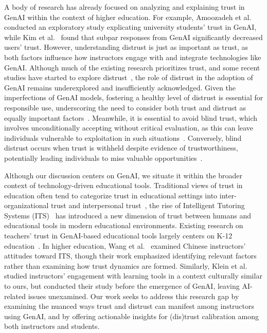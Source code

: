 A body of research has already focused on analyzing and explaining trust in GenAI within the context of higher education. For example, Amoozadeh et al.~\cite{amoozadeh2024trust} conducted an exploratory study explicating university students' trust in GenAI, while Kim et al.~\cite{kim2023you} found that subpar responses from GenAI significantly decreased users' trust. However, understanding distrust is just as important as trust, as both factors influence how instructors engage with and integrate technologies like GenAI. Although much of the existing research prioritizes trust, and some recent studies have started to explore distrust~\cite{lankton2015technology, zhang2024profiling}, the role of distrust in the adoption of GenAI remains underexplored and insufficiently acknowledged. Given the imperfections of GenAI models, fostering a healthy level of distrust is essential for responsible use, underscoring the need to consider both trust and distrust as equally important factors~\cite{peters2023importance}. Meanwhile, it is essential to avoid blind trust, which involves unconditionally accepting without critical evaluation, as this can leave individuals vulnerable to exploitation in such situations~\cite{min2023development}. Conversely, blind distrust occurs when trust is withheld despite evidence of trustworthiness, potentially leading individuals to miss valuable opportunities~\cite{beccerra1999trust}. 

Although our discussion centers on GenAI, we situate it within the broader context of technology-driven educational tools. Traditional views of trust in education often tend to categorize trust in educational settings into inter-organizational trust and interpersonal trust~\cite{niedlich2021comprehensive}, the rise of Intelligent Tutoring Systems (ITS)~\cite{nwana1990intelligent, sleeman1982intelligent} has introduced a new dimension of trust between humans and educational tools in modern educational environments. Existing research on teachers' trust in GenAI-based educational tools largely centers on K-12 education~\cite{nazaretsky2022teachers, viberg2024explains, qin2020understanding, nazaretsky2022instrument, beege2024ai}. In higher education, Wang et al.~\cite{wang2020participant} examined Chinese instructors’ attitudes toward ITS, though their work emphasized identifying relevant factors rather than examining how trust dynamics are formed. Similarly, Klein et al.~\cite{klein2019technological} studied instructors’ engagement with learning tools in a context culturally similar to ours, but conducted their study before the emergence of GenAI, leaving AI-related issues unexamined. Our work seeks to address this research gap by examining the nuanced ways trust and distrust can manifest among instructors using GenAI, and by offering actionable insights for (dis)trust calibration among both instructors and students.

